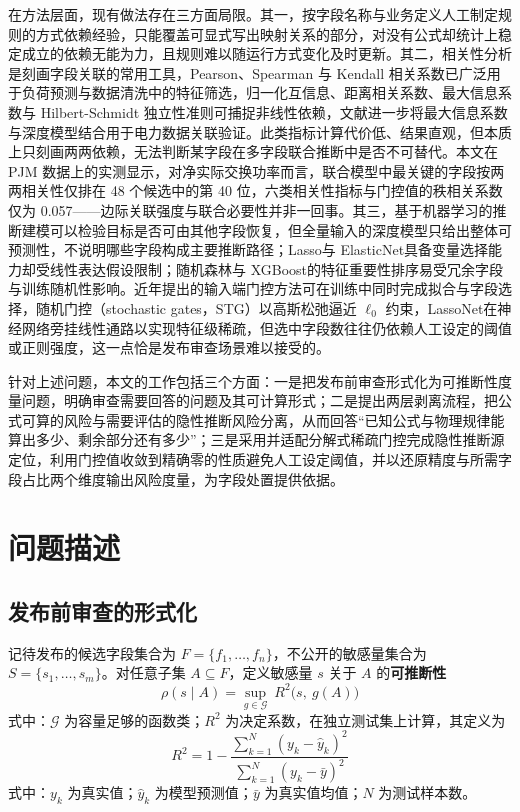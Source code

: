 \documentclass[UTF8,zihao=5,twoside]{ctexart}
\begin{document}
在方法层面，现有做法存在三方面局限。其一，按字段名称与业务定义人工制定规则的方式依赖经验，只能覆盖可显式写出映射关系的部分，对没有公式却统计上稳定成立的依赖无能为力，且规则难以随运行方式变化及时更新。其二，相关性分析是刻画字段关联的常用工具，Pearson、Spearman 与 Kendall 相关系数\cite{ref-pearson,ref-spearman,ref-kendall}已广泛用于负荷预测与数据清洗中的特征筛选\cite{ref-lan-load,ref-jiao-pv,ref-deng-load}，归一化互信息\cite{ref-cover-info}、距离相关系数\cite{ref-szekely-dcorr}、最大信息系数\cite{ref-reshef-mic}与 Hilbert-Schmidt 独立性准则\cite{ref-gretton-hsic}可捕捉非线性依赖，文献\cite{ref-xing-micdnn}进一步将最大信息系数与深度模型结合用于电力数据关联验证。此类指标计算代价低、结果直观，但本质上只刻画两两依赖，无法判断某字段在多字段联合推断中是否不可替代。本文在 PJM 数据上的实测显示，对净实际交换功率而言，联合模型中最关键的字段按两两相关性仅排在 48 个候选中的第 40 位，六类相关性指标与门控值的秩相关系数仅为 0.057——边际关联强度与联合必要性并非一回事。其三，基于机器学习的推断建模可以检验目标是否可由其他字段恢复\cite{ref-lecun-deep,ref-goodfellow-deep,ref-wang-meter}，但全量输入的深度模型只给出整体可预测性，不说明哪些字段构成主要推断路径；Lasso\cite{ref-tibshirani-lasso}与 ElasticNet\cite{ref-zou-enet}具备变量选择能力却受线性表达假设限制；随机森林\cite{ref-breiman-rf}与 XGBoost\cite{ref-chen-xgboost}的特征重要性排序易受冗余字段与训练随机性影响。近年提出的输入端门控方法可在训练中同时完成拟合与字段选择，随机门控（stochastic gates，STG）\cite{ref-stg}以高斯松弛逼近 $\ell_0$ 约束，LassoNet\cite{ref-lassonet}在神经网络旁挂线性通路以实现特征级稀疏，但选中字段数往往仍依赖人工设定的阈值或正则强度，这一点恰是发布审查场景难以接受的。

针对上述问题，本文的工作包括三个方面：一是把发布前审查形式化为可推断性度量问题，明确审查需要回答的问题及其可计算形式；二是提出两层剥离流程，把公式可算的风险与需要评估的隐性推断风险分离，从而回答“已知公式与物理规律能算出多少、剩余部分还有多少”；三是采用并适配分解式稀疏门控完成隐性推断源定位，利用门控值收敛到精确零的性质避免人工设定阈值，并以还原精度与所需字段占比两个维度输出风险度量，为字段处置提供依据。

\section{问题描述}

\subsection{发布前审查的形式化}

记待发布的候选字段集合为 $F=\{f_1,\dots,f_n\}$，不公开的敏感量集合为 $S=\{s_1,\dots,s_m\}$。对任意子集 $A\subseteq F$，定义敏感量 $s$ 关于 $A$ 的\textbf{可推断性}
\begin{equation}
\rho(s\mid A)=\sup_{g\in\mathcal{G}}\ R^2\big(s,\ g(A)\big)
\end{equation}
式中：$\mathcal{G}$ 为容量足够的函数类；$R^2$ 为决定系数，在独立测试集上计算，其定义为
\begin{equation}
R^2=1-\frac{\sum_{k=1}^{N}(y_k-\hat y_k)^2}{\sum_{k=1}^{N}(y_k-\bar y)^2}
\end{equation}
式中：$y_k$ 为真实值；$\hat y_k$ 为模型预测值；$\bar y$ 为真实值均值；$N$ 为测试样本数。
\end{document}
